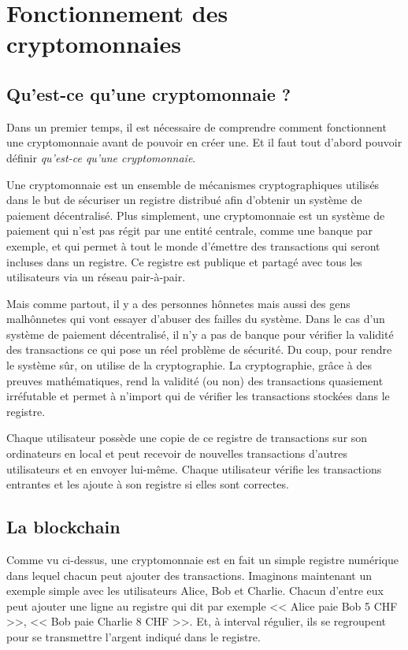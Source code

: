 \chapter{Fonctionnement des cryptomonnaies}
\label{ch:presentation}

\section{Qu'est-ce qu'une cryptomonnaie ?}

Dans un premier temps, il est nécessaire de comprendre comment fonctionnent une cryptomonnaie avant de pouvoir en créer une. Et il faut tout d'abord pouvoir définir \emph{qu'est-ce qu'une cryptomonnaie}.

Une cryptomonnaie est un ensemble de mécanismes cryptographiques utilisés dans le but de sécuriser un registre distribué afin d'obtenir un système de paiement décentralisé. Plus simplement, une cryptomonnaie est un système de paiement qui n'est pas régit par une entité centrale, comme une banque par exemple, et qui permet à tout le monde d'émettre des transactions qui seront incluses dans un registre. Ce registre est publique et partagé avec tous les utilisateurs via un réseau pair-à-pair.

Mais comme partout, il y a des personnes hônnetes mais aussi des gens malhônnetes qui vont essayer d'abuser des failles du système. Dans le cas d'un système de paiement décentralisé, il n'y a pas de banque pour vérifier la validité des transactions ce qui pose un réel problème de sécurité. Du coup, pour rendre le système sûr, on utilise de la cryptographie. La cryptographie, grâce à des preuves mathématiques, rend la validité (ou non) des transactions quasiement irréfutable et permet à n'import qui de vérifier les transactions stockées dans le registre.

Chaque utilisateur possède une copie de ce registre de transactions sur son ordinateurs en local et peut recevoir de nouvelles transactions d'autres utilisateurs et en envoyer lui-même. Chaque utilisateur vérifie les transactions entrantes et les ajoute à son registre si elles sont correctes.

\section{La blockchain}

Comme vu ci-dessus, une cryptomonnaie est en fait un simple registre numérique dans lequel chacun peut ajouter des transactions. Imaginons maintenant un exemple simple avec les utilisateurs Alice, Bob et Charlie. Chacun d'entre eux peut ajouter une ligne au registre qui dit par exemple << Alice paie Bob 5 CHF >>, << Bob paie Charlie 8 CHF >>. Et, à interval régulier, ils se regroupent pour se transmettre l'argent indiqué dans le registre.

